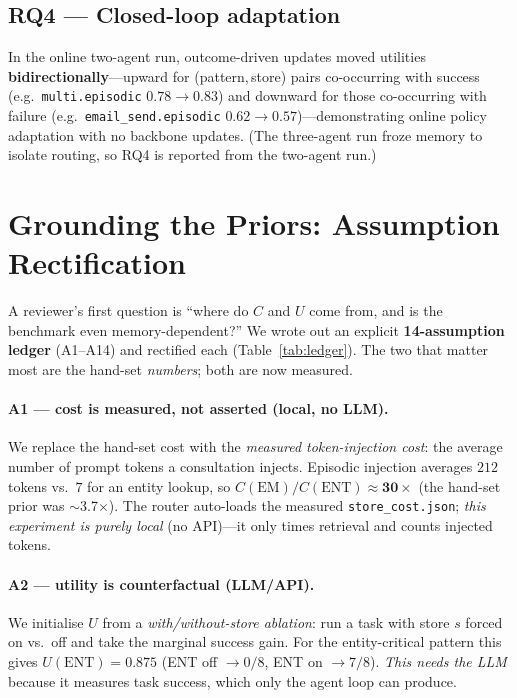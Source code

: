 \documentclass[10pt,twocolumn]{article}
\newcommand{\code}[1]{\texttt{\small #1}}
\begin{document}
\subsection{RQ4 --- Closed-loop adaptation}
In the online two-agent run, outcome-driven updates moved utilities
\textbf{bidirectionally}---upward for (pattern,\,store) pairs co-occurring with
success (e.g.\ \code{multi.episodic} $0.78{\rightarrow}0.83$) and downward for
those co-occurring with failure (e.g.\ \code{email\_send.episodic}
$0.62{\rightarrow}0.57$)---demonstrating online policy adaptation with no backbone
updates. (The three-agent run froze memory to isolate routing, so RQ4 is reported
from the two-agent run.)

\section{Grounding the Priors: Assumption Rectification}\label{sec:rectify}
A reviewer's first question is ``where do $C$ and $U$ come from, and is the
benchmark even memory-dependent?'' We wrote out an explicit \textbf{14-assumption
ledger} (A1--A14) and rectified each (Table~\ref{tab:ledger}). The two that matter
most are the hand-set \emph{numbers}; both are now measured.

\paragraph{A1 --- cost is measured, not asserted (local, no LLM).} We replace the
hand-set cost with the \emph{measured token-injection cost}: the average number of
prompt tokens a consultation injects. Episodic injection averages $212$ tokens vs.\
$7$ for an entity lookup, so $C(\text{EM})/C(\text{ENT})\approx\mathbf{30\times}$
(the hand-set prior was $\sim$3.7$\times$). The router auto-loads the measured
\code{store\_cost.json}; \emph{this experiment is purely local} (no API)---it only
times retrieval and counts injected tokens.

\paragraph{A2 --- utility is counterfactual (LLM/API).} We initialise $U$ from a
\emph{with/without-store ablation}: run a task with store $s$ forced on vs.\ off and
take the marginal success gain. For the entity-critical pattern this gives
$U(\text{ENT}){=}\mathbf{0.875}$ (ENT off $\to0/8$, ENT on $\to7/8$). \emph{This
needs the LLM} because it measures task success, which only the agent loop can
produce.
\end{document}
